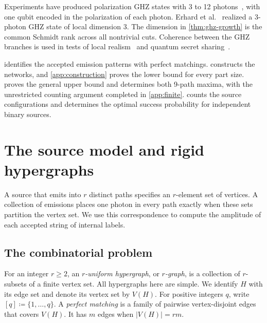 \documentclass[10pt]{article}
\numberwithin{equation}{section}
\theoremstyle{definition}
\begin{document}
Experiments have produced polarization GHZ states with 3 to 12 photons~\cite{BouwmeesterEtAl1999,ZhaoEtAl2004,WangEtAl2016,ZhongEtAl2018}, with one qubit encoded in the polarization of each photon. Erhard et al.~\cite{ErhardMalikKrennZeilinger2018} realized a 3-photon GHZ state of local dimension 3. The dimension in \cref{thm:ghz-growth} is the common Schmidt rank across all nontrivial cuts. Coherence between the GHZ branches is used in tests of local realism~\cite{GreenbergerHorneShimonyZeilinger1990,Lawrence2014} and quantum secret sharing~\cite{HilleryBuzekBerthiaume1999}.

 identifies the accepted emission patterns with perfect matchings.  constructs the networks, and \cref{app:construction} proves the lower bound for every part size.  proves the general upper bound and determines both 9-path maxima, with the unrestricted counting argument completed in \cref{app:finite}.  counts the source configurations and determines the optimal success probability for independent binary sources.

\section{The source model and rigid hypergraphs}\label{sec:model}

A source that emits into $r$ distinct paths specifies an $r$-element set of vertices. A collection of emissions places one photon in every path exactly when these sets partition the vertex set. We use this correspondence to compute the amplitude of each accepted string of internal labels.

\subsection{The combinatorial problem}

For an integer $r\ge2$, an \emph{$r$-uniform hypergraph}, or \emph{$r$-graph}, is a collection of $r$-subsets of a finite vertex set. All hypergraphs here are simple. We identify $H$ with its edge set and denote its vertex set by $V(H)$. For positive integers $q$, write $[q]\coloneqq\{1,\ldots,q\}$. A \emph{perfect matching} is a family of pairwise vertex-disjoint edges that covers $V(H)$. It has $m$ edges when $|V(H)|=rm$.
\end{document}
